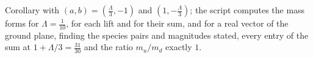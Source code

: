 Corollary  with $(a, b) = (\tfrac{\Lambda}{3}, -1)$ and $(1, -\tfrac{\Lambda}{3})$; the script computes the mass forms for $\Lambda = \tfrac{1}{10}$, for each lift and for their sum, and for a real vector of the ground plane, finding the species pairs and magnitudes stated, every entry of the sum at $1 + \Lambda/3 = \tfrac{31}{30}$ and the ratio $m_{u}/m_{d}$ exactly $1$.
